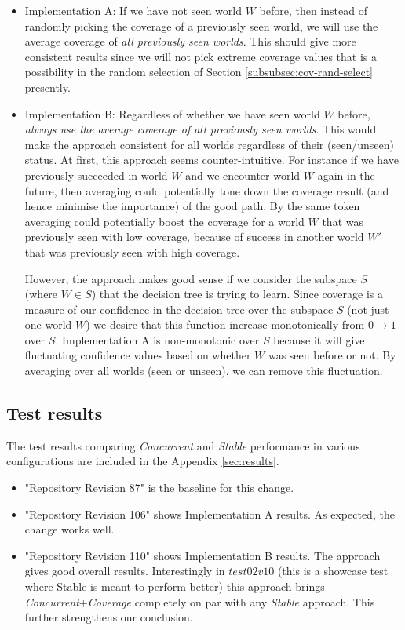 \documentclass[a4paper]{article}
\newcommand{\cc}{\emph{Concurrent}\xspace}
\newcommand{\st}{\emph{Stable}\xspace}
\newcommand{\cov}{\emph{Coverage}\xspace}
\newcommand{\dt}{{decision tree}\xspace}
\begin{document}
\begin{itemize}

\item Implementation A: If we have not seen world $W$ before, then instead of randomly picking the coverage of a previously seen world, we will use the average coverage of \textit{all previously seen worlds}. This should give more consistent results since we will not pick extreme coverage values that is a possibility in the random selection of Section \ref{subsubsec:cov-rand-select} presently. 

\item Implementation B: Regardless of whether we have seen world $W$ before, \textit{always use the average coverage of all previously seen worlds}. This would make the approach consistent for all worlds regardless of their (seen/unseen) status. At first, this approach seems counter-intuitive. For instance if we have previously succeeded in world $W$ and we encounter world $W$ again in the future, then averaging could potentially tone down the coverage result (and hence minimise the importance) of the good path. By the same token averaging could potentially boost the coverage for a world $W$ that was previously seen with low coverage, because of success in another world $W'$ that was previously seen with high coverage. 

However, the approach makes good sense if we consider the subspace $S$ (where $W \in S$) that the \dt is trying to learn. Since coverage is a measure of our confidence in the \dt over the subspace $S$ (not just one world $W$) we desire that this function increase monotonically from $0\to1$ over $S$. Implementation A is non-monotonic over $S$ because it will give fluctuating confidence values based on whether $W$ was seen before or not. By averaging over all worlds (seen or unseen), we can remove this fluctuation.

\end{itemize}

\subsection{Test results}

The test results comparing \cc and \st performance in various configurations are included in the Appendix \ref{sec:results}.
\begin{itemize}
\item "Repository Revision 87" is the baseline for this change.

\item "Repository Revision 106" shows Implementation A results. As expected, the change works well.

\item  "Repository Revision 110" shows Implementation B results. The approach gives good overall results. Interestingly in $test02v10$ (this is a showcase test where Stable is meant to perform better) this approach brings \cc+\cov completely on par with any \st approach. This further strengthens our conclusion. 

\end{itemize}
\end{document}
